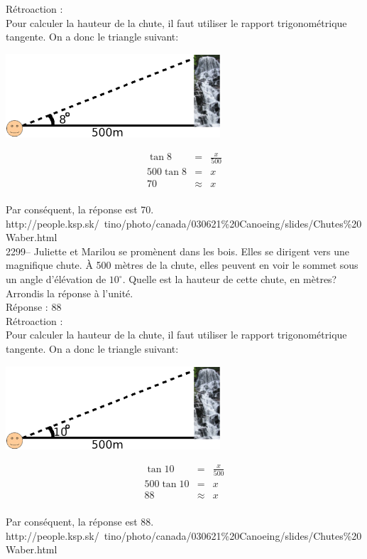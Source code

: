 \documentclass[letterpaper, 12pt]{article}
\begin{document}
R\'etroaction :\\
Pour calculer la hauteur de la chute, il faut utiliser le rapport trigonom\'etrique tangente. On a donc le triangle suivant:
\begin{center}
 \includegraphics[width=8cm,bb=14 14 845 315]{2298chutes.eps}
\end{center}
\begin{eqnarray*}
\tan{8}&=&\frac{x}{500}\\[2mm]
500\tan{8}&=&x\\[2mm]
70&\approx&x
\end{eqnarray*}\\
Par cons\'equent, la r\'eponse est 70.\\
http://people.ksp.sk/~tino/photo/canada/030621\%20Canoeing/slides/Chutes\%20Waber.html\\

2299--  Juliette et Marilou se prom\`enent dans les bois. Elles se dirigent vers une magnifique chute. \`A 500 m\`etres de la chute, elles peuvent en voir le sommet sous un angle d'\'el\'evation de $10^{\circ}$. Quelle est la hauteur de cette chute, en m\`etres? Arrondis la r\'eponse \`a l'unit\'e.\\

R\'eponse : 88\\

R\'etroaction :\\
Pour calculer la hauteur de la chute, il faut utiliser le rapport trigonom\'etrique tangente. On a donc le triangle suivant:
\begin{center}
 \includegraphics[width=8cm,bb=14 14 845 315]{Q2298chutes.eps}
\end{center}
\begin{eqnarray*}
\tan{10}&=&\frac{x}{500}\\[2mm]
500\tan{10}&=&x\\[2mm]
88&\approx&x
\end{eqnarray*}\\
Par cons\'equent, la r\'eponse est 88.\\
http://people.ksp.sk/~tino/photo/canada/030621\%20Canoeing/slides/Chutes\%20Waber.html\\
\end{document}
